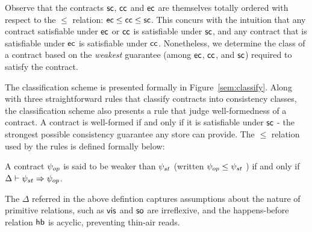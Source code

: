 \noindent Observe that the contracts ${\sf sc}$, ${\sf cc}$ and ${\sf ec}$ are themselves
totally ordered with respect to the $\le$ relation: ${\sf ec} \le {\sf cc} \le {\sf sc}$.
This concurs with the intuition that any contract satisfiable under ${\sf ec}$ or
${\sf cc}$ is satisfiable under ${\sf sc}$, and any contract that is satisfiable under
${\sf ec}$ is satisfiable under ${\sf cc}$. Nonetheless, we determine the class of a
contract based on the \emph{weakest} guarantee (among ${\sf ec}$, ${\sf cc}$, and
${\sf sc}$) required to satisfy the contract.



The classification scheme is presented formally in Figure~\ref{sem:classify}.
Along with three straightforward rules that classify contracts into consistency
classes, the classification scheme also presents a rule that judge
well-formedness of a contract. A contract is well-formed if and only if it is
satisfiable under ${\sf sc}$ - the strongest possible consistency guarantee any
store can provide. The $\le$ relation used by the rules is defined formally
below:

\begin{definition}
A contract $\psi_{op}$ is said to be weaker than $\psi_{st}$ (written $\psi_{op}
\le \psi_{st}$ ) if and only if $\Delta \vdash \psi_{st} \Rightarrow \psi_{op}$.
\begin{center}
\end{center}
\end{definition}
\vspace{-1em}

The $\Delta$ referred in the above defintion captures assumptions about the
nature of primitive relations, such as ${\normalfont \textsf{vis}}$ and ${\normalfont \textsf{so}}$ are irreflexive, and
the happens-before relation ${\normalfont \textsf{hb}}$ is acyclic, preventing thin-air reads.
